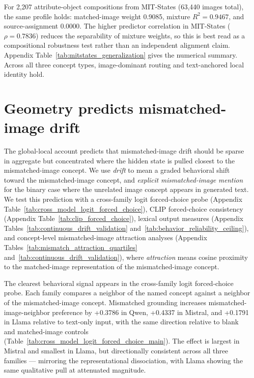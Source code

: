 \documentclass{article}
\begin{document}
For 2,207 attribute-object compositions from MIT-States (63,440 images total), the same profile holds: matched-image weight 0.9085, mixture \(R^2 = 0.9467\), and source-assignment 0.0000. The higher predictor correlation in MIT-States (\(\rho=0.7836\)) reduces the separability of mixture weights, so this is best read as a compositional robustness test rather than an independent alignment claim. Appendix Table~\ref{tab:mitstates_generalization} gives the numerical summary. Across all three concept types, image-dominant routing and text-anchored local identity hold.

\section{Geometry predicts mismatched-image drift}
\label{sec:geometry_output}

The global-local account predicts that mismatched-image drift should be sparse in aggregate but concentrated where the hidden state is pulled closest to the mismatched-image concept. We use \textit{drift} to mean a graded behavioral shift toward the mismatched-image concept, and \textit{explicit mismatched-image mention} for the binary case where the unrelated image concept appears in generated text. We test this prediction with a cross-family logit forced-choice probe (Appendix Table~\ref{tab:cross_model_logit_forced_choice}), CLIP forced-choice consistency (Appendix Table~\ref{tab:clip_forced_choice}), lexical output measures (Appendix Tables~\ref{tab:continuous_drift_validation} and~\ref{tab:behavior_reliability_ceiling}), and concept-level mismatched-image attraction analyses (Appendix Tables~\ref{tab:mismatch_attraction_quartiles} and~\ref{tab:continuous_drift_validation}), where \textit{attraction} means cosine proximity to the matched-image representation of the mismatched-image concept.

The clearest behavioral signal appears in the cross-family logit forced-choice probe. Each family compares a neighbor of the named concept against a neighbor of the mismatched-image concept. Mismatched grounding increases mismatched-image-neighbor preference by +0.3786 in Qwen, +0.4337 in Mistral, and +0.1791 in Llama relative to text-only input, with the same direction relative to blank and matched-image controls (Table~\ref{tab:cross_model_logit_forced_choice_main}). The effect is largest in Mistral and smallest in Llama, but directionally consistent across all three families --- mirroring the representational dissociation, with Llama showing the same qualitative pull at attenuated magnitude.
\end{document}
